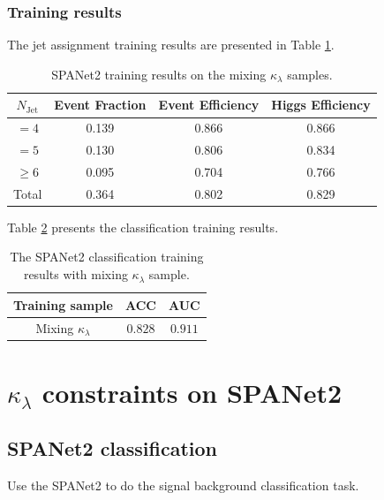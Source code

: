 \documentclass[12pt]{article}
\begin{document}
		\subsubsection{Training results}%
		\label{subs:training_results}
			The jet assignment training results are presented in Table \ref{tab:SPANet2_diHiggs_4b_pt40_mix_class}.
			\begin{table}[htpb]
				\centering
				\caption{SPANet2 training results on the mixing $\kappa_\lambda$ samples.}
				\label{tab:SPANet2_diHiggs_4b_pt40_mix_class}
				\begin{tabular}{c|c|cc}
					$N_\text{Jet}$ & Event Fraction & Event Efficiency & Higgs Efficiency \\
					\hline
					$=4$	  &   0.139             &    0.866              &    0.866             \\
					$=5$	  &   0.130             &    0.806              &    0.834             \\
					$\ge 6$	  &   0.095             &    0.704              &    0.766             \\
					Total	  &   0.364             &    0.802              &    0.829             \\
				\end{tabular}
			\end{table}	

			Table \ref{tab:SPANET_cls_results} presents the classification training results.
			\begin{table}[htpb]
				\centering
				\caption{The SPANet2 classification training results with mixing $\kappa_\lambda$ sample.}
				\label{tab:SPANET_cls_results}
				\begin{tabular}{c|cc}
				Training sample        & ACC     & AUC   \\ \hline
				Mixing $\kappa_\lambda $ & $0.828$ & $0.911$
				\end{tabular}      
			\end{table}

\section{\texorpdfstring{$\kappa_\lambda$}{kappa} constraints on SPANet2}%
\label{sec:kappa_constraints_on_spanet2}

	\subsection{SPANet2 classification}%
	\label{sub:spanet2_classification}
		Use the SPANet2 to do the signal background classification task. 
\end{document}
